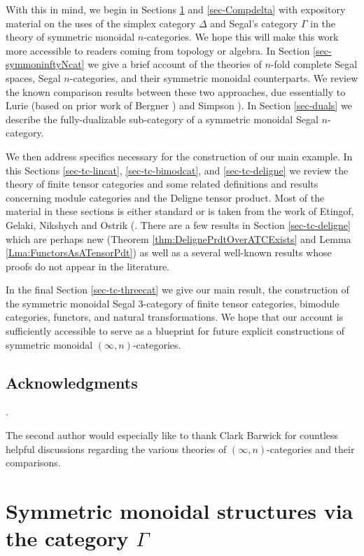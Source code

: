 \documentclass{amsart}
\begin{document}
With this in mind, we begin in Sections \ref{sec-symmonGamma} and \ref{sec-Compdelta} with expository material on the uses of the simplex category $\Delta$ and Segal's category $\Gamma$ in the theory of symmetric monoidal $n$-categories. We hope this will make this work more accessible to readers coming from topology or algebra. In Section \ref{sec-symmoninftyNcat} we give a brief account of the theories of $n$-fold complete Segal spaces, Segal $n$-categories, and their symmetric monoidal counterparts. We review the known comparison results between these two approaches, due essentially to Lurie \cite{0905.0462} (based on prior work of Bergner \cite{MR2321038}) and Simpson \cite{1001.4071}). In Section \ref{sec-duals} we describe the fully-dualizable sub-category of a symmetric monoidal Segal $n$-category. 

We then address specifics necessary for the construction of our main example. In this Sections \ref{sec-tc-lincat}, \ref{sec-tc-bimodcat}, and \ref{sec-tc-deligne} we review the theory of finite tensor categories and some related definitions and results concerning module categories and the Deligne tensor product.  Most of the material in these sections is either standard or is taken from the work of Etingof, Gelaki, Nikshych and Ostrik (\cite{MR1976459,MR2183279,MR2097289, 0909.3140, EGNO}.  There are a few results in Section \ref{sec-tc-deligne} which are perhaps new (Theorem \ref{thm:DelignePrdtOverATCExists} and Lemma \ref{Lma:FunctorsAsATensorPdt}) as well as a several well-known results whose proofs do not appear in the literature. 

In the final Section \ref{sec-tc-threecat} we give our main result, the construction of the symmetric monoidal Segal 3-category of finite tensor categories,  bimodule categories, functors, and natural transformations. We hope that our account is sufficiently accessible to serve as a blueprint for future explicit constructions of  symmetric monoidal $(\infty,n)$-categories. 


\subsection*{Acknowledgments}.

The second author would especially like to thank Clark Barwick for countless helpful discussions regarding the various theories of $(\infty,n)$-categories and their comparisons. 



\section{Symmetric monoidal structures via the category $\Gamma$} \label{sec-symmonGamma}
\end{document}
